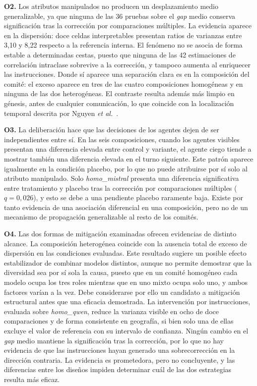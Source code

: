 \textbf{O2.} Los atributos manipulados no producen un desplazamiento medio generalizable, ya que ninguna de las 36 pruebas sobre el \textit{gap} medio conserva significación tras la corrección por comparaciones múltiples. La evidencia aparece en la dispersión: doce celdas interpretables presentan ratios de varianzas entre 3,10 y 8,22 respecto a la referencia interna. El fenómeno no se asocia de forma estable a determinadas cestas, puesto que ninguna de las 42 estimaciones de correlación intraclase sobrevive a la corrección, y tampoco aumenta al enriquecer las instrucciones. Donde sí aparece una separación clara es en la composición del comité: el exceso aparece en tres de las cuatro composiciones homogéneas y en ninguna de las dos heterogéneas. El contraste resulta además más limpio en génesis, antes de cualquier comunicación, lo que coincide con la localización temporal descrita por Nguyen \textit{et al.}~\cite{nguyen2025social}.

\textbf{O3.} La deliberación hace que las decisiones de los agentes dejen de ser independientes entre sí. En las seis composiciones, cuando los agentes visibles presentan una diferencia elevada entre control y variante, el agente ciego tiende a mostrar también una diferencia elevada en el turno siguiente. Este patrón aparece igualmente en la condición placebo, por lo que no puede atribuirse por sí solo al atributo manipulado. Solo \textit{homo\_mistral} presenta una diferencia significativa entre tratamiento y placebo tras la corrección por comparaciones múltiples ($q=0{,}026$), y esto se debe a una pendiente placebo raramente baja. Existe por tanto evidencia de una asociación diferencial en una composición, pero no de un mecanismo de propagación generalizable al resto de los comités.

\textbf{O4.} Las dos formas de mitigación examinadas ofrecen evidencias de distinto alcance. La composición heterogénea coincide con la ausencia total de exceso de dispersión en las condiciones evaluadas. Este resultado sugiere un posible efecto estabilizador de combinar modelos distintos, aunque no permite demostrar que la diversidad sea por sí sola la causa, puesto que en un comité homogéneo cada modelo ocupa los tres roles mientras que en uno mixto ocupa solo uno, y ambos factores varían a la vez. Debe considerarse por ello un candidato a mitigación estructural antes que una eficacia demostrada. La intervención por instrucciones, evaluada sobre \textit{homo\_qwen}, reduce la varianza visible en ocho de doce comparaciones y de forma consistente en geografía, si bien solo una de ellas excluye el valor de referencia con su intervalo de confianza. Ningún cambio en el \textit{gap} medio mantiene la significación tras la corrección, por lo que no hay evidencia de que las instrucciones hayan generado una sobrecorrección en la dirección contraria. La evidencia es prometedora, pero no concluyente, y las diferencias entre los diseños impiden determinar cuál de las dos estrategias resulta más eficaz.

